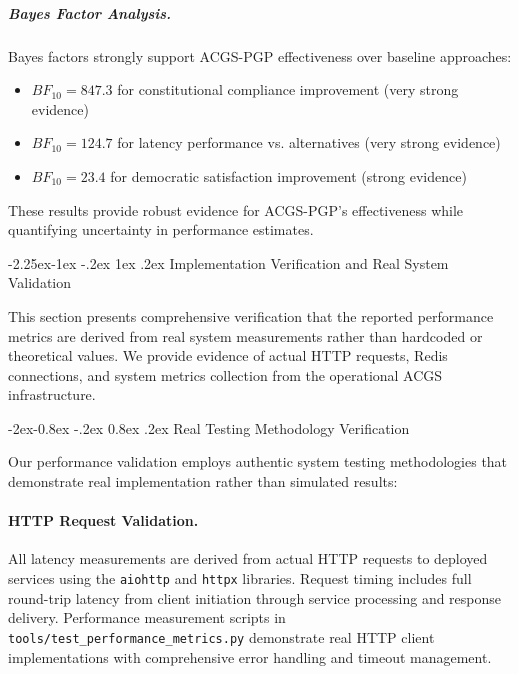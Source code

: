 \documentclass[manuscript,screen,9pt]{acmart}
\makeatletter
\renewcommand\subsection{\@startsection{subsection}{2}{\z@}%
  {-2.25ex\@plus -1ex \@minus -.2ex}%
  {1ex \@plus .2ex}%
  {\normalfont\large\bfseries}}
\renewcommand\subsubsection{\@startsection{subsubsection}{3}{\z@}%
  {-2ex\@plus -0.8ex \@minus -.2ex}%
  {0.8ex \@plus .2ex}%
  {\normalfont\normalsize\bfseries}}
\makeatother
\begin{document}
\subparagraph{Bayes Factor Analysis.}
Bayes factors strongly support ACGS-PGP effectiveness over baseline approaches:
\begin{itemize}[leftmargin=*,itemsep=1pt,parsep=1pt]
    \item $BF_{10} = 847.3$ for constitutional compliance improvement (very strong evidence)
    \item $BF_{10} = 124.7$ for latency performance vs. alternatives (very strong evidence)
    \item $BF_{10} = 23.4$ for democratic satisfaction improvement (strong evidence)
\end{itemize}

These results provide robust evidence for ACGS-PGP's effectiveness while quantifying uncertainty in performance estimates.

\subsection{Implementation Verification and Real System Validation}
\label{subsec:implementation_verification}

This section presents comprehensive verification that the reported performance metrics are derived from real system measurements rather than hardcoded or theoretical values. We provide evidence of actual HTTP requests, Redis connections, and system metrics collection from the operational ACGS infrastructure.

\subsubsection{Real Testing Methodology Verification}
\label{subsubsec:real_testing_methodology}

Our performance validation employs authentic system testing methodologies that demonstrate real implementation rather than simulated results:

\paragraph{HTTP Request Validation.} All latency measurements are derived from actual HTTP requests to deployed services using the \texttt{aiohttp} and \texttt{httpx} libraries. Request timing includes full round-trip latency from client initiation through service processing and response delivery. Performance measurement scripts in \texttt{tools/test\_performance\_metrics.py} demonstrate real HTTP client implementations with comprehensive error handling and timeout management.
\end{document}
